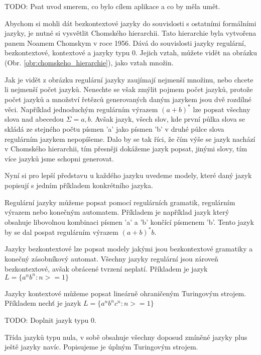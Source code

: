 TODO: Psat uvod smerem, co bylo cílem aplikace a co by měla umět.


Abychom si mohli dát bezkontextové jazyky do souvislosti s ostatními formálními jazyky, je nutné si vysvětlit Chomského hierarchii. Tato hierarchie byla vytvořena panem Noamem Chomskym v roce 1956. Dává do souvislosti jazyky regulární, bezkontextové, kontextové a jazyky typu 0. Jejich vztah, můžete vidět na obrázku (Obr. \ref{obr:chomskeho_hierarchie}), jako vztah množin.


Jak je vidět z obrázku regulární jazyky zaujímají nejmenší množinu, nebo chcete li nejmenší počet jazyků. Nenechte se však zmýlit pojmem  počet jazyků, protože počet jazyků a množství řetězců generovaných daným jazykem jsou dvě rozdílné věci. Například jednoduchým regulárním výrazem \( (a + b)^* \) lze popsat všechny slova nad abecedou \( \Sigma = {a, b} \). Avšak jazyk, všech slov, kde první půlka slova se skládá ze stejného počtu písmen 'a' jako písmen 'b' v druhé půlce slova regulárním jazykem nepopíšeme. Dalo by se tak říci, že čím výše se jazyk nachází v Chomského hierarchii, tím přesněji dokážeme jazyk popsat, jinými slovy, tím více jazyků jsme schopni generovat.

Nyní si pro lepší představu u každého jazyku uvedeme modely, které daný jazyk popisují s jedním příkladem konkrétního jazyka.

Regulární jazyky můžeme popsat pomocí regulárních gramatik, regulárním výrazem nebo konečným automatem. Příkladem je například jazyk který obsahuje libovolnou kombinaci písmen 'a' a 'b' končící písmenem 'b'. Tento jazyk by se dal pospat regulárním výrazem \( (a + b)^* b \). 

Jazyky bezkontextové lze popsat modely jakými jsou bezkontextové gramatiky a konečný zásobníkový automat. Všechny jazyky regulární jsou zároveň bezkontextové, avšak obrácené tvrzení neplatí. Příkladem je jazyk \( L = \{ a^n b^n : n >= 1 \}  \)

Jazyky kontextové můžeme popsat lineárně ohraničeným Turingovým strojem. Příkladem nechť je jazyk \( L = \{ a^n b^n c^n : n >= 1 \}  \)

TODO: Doplnit jazyk typu 0.

Třída jazyků typu nula, v sobě obsahuje všechny doposud zmíněné jazyky plus ještě jazyky navíc. Popisujeme je úplným Turingovým strojem. 
\cite{Chomsky_hierarchy}

